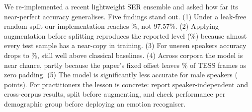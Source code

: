 We re-implemented a recent lightweight SER ensemble and asked how far its near-perfect accuracy generalises. Five
findings stand out. (1) Under a leak-free random split our implementation reaches \AccPaperEns\%, not 97.57\%.
(2) Applying augmentation before splitting reproduces the reported level (\AccLeakyEns\%) because almost every test
sample has a near-copy in training. (3) For unseen speakers accuracy drops to \AccSpkEns\%, still well above
classical baselines. (4) Across corpora the model is near chance, partly because the paper's fixed offset leaves
\OffsetPadPaper\% of TESS frames as zero padding. (5) The model is significantly less accurate for male speakers
(\GenderGapEns{} points). For practitioners the lesson is concrete: report speaker-independent and cross-corpus
results, split before augmenting, and check performance per demographic group before deploying an emotion
recogniser.
